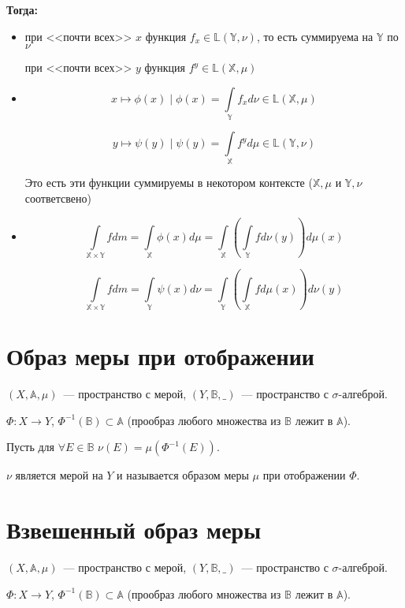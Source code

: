 \documentclass[paper=a4, fontsize=17pt]{article}
\begin{document}
	\textbf{Тогда:}
	\begin{itemize}
		\item
		при <<почти всех>> $x$ функция $f_x \in \mathds{L}(\mathds{Y},\nu)$, то есть суммируема на $\mathds{Y}$ по $\nu$
		
		при <<почти всех>> $y$ функция $f^y \in \mathds{L}(\mathds{X},\mu)$
		
		\item
		$$x \mapsto \phi(x) \mid \phi(x) = \int\limits_{\mathds{Y}}f_x d\nu \in \mathds{L}(\mathds{X},\mu)$$
		
		$$y \mapsto \psi(y) \mid \psi(y) = \int\limits_{\mathds{X}}f^y d\mu \in \mathds{L}(\mathds{Y},\nu)$$
		
		Это есть эти функции суммируемы в некотором контексте ($\mathds{X},\mu$ и $\mathds{Y},\nu$ соответсвено)
		
		\item
		$$\int\limits_{\mathds{X} \times \mathds{Y}} f dm
		= \int\limits_{\mathds{X}}\phi(x) d\mu
		= \int\limits_{\mathds{X}} (\int\limits_{\mathds{Y}} f d\nu(y)) d\mu(x)$$
		
		$$\int\limits_{\mathds{X} \times \mathds{Y}} f dm
		= \int\limits_{\mathds{Y}}\psi(x) d\nu
		= \int\limits_{\mathds{Y}} (\int\limits_{\mathds{X}} f d\mu(x)) d\nu(y)$$
	\end{itemize}
	
	\section{Образ меры при отображении}
	$(X, \mathds{A}, \mu)$~--- пространство с мерой, $(Y, \mathds{B}, \_)$~--- пространство с $\sigma$-алгеброй.
	
	$\Phi: X \to Y$, $\Phi^{-1}(\mathds{B}) \subset \mathds{A}$ (прообраз любого множества из $\mathds{B}$ лежит в $\mathds{A}$).
	
	Пусть для $\forall E \in \mathds{B}$ $\nu(E) = \mu(\Phi^{-1}(E))$.
	
	$\nu$ является мерой на $Y$ и называется образом меры $\mu$ при отображении $\Phi$.
	
	\section{Взвешенный образ меры}
	$(X, \mathds{A}, \mu)$~--- пространство с мерой, $(Y, \mathds{B}, \_)$~--- пространство с $\sigma$-алгеброй.
	
	$\Phi: X \to Y$, $\Phi^{-1}(\mathds{B}) \subset \mathds{A}$ (прообраз любого множества из $\mathds{B}$ лежит в $\mathds{A}$).
	
\end{document}
